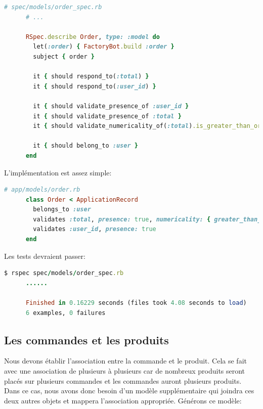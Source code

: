 \documentclass[]{report}
\begin{document}
    \begin{scriptsize}
      \begin{lstlisting}[language=ruby, caption={Premiers tests du modèle de commande}]
      # spec/models/order_spec.rb
      # ...

      RSpec.describe Order, type: :model do
        let(:order) { FactoryBot.build :order }
        subject { order }

        it { should respond_to(:total) }
        it { should respond_to(:user_id) }

        it { should validate_presence_of :user_id }
        it { should validate_presence_of :total }
        it { should validate_numericality_of(:total).is_greater_than_or_equal_to(0) }

        it { should belong_to :user }
      end
      \end{lstlisting}
    \end{scriptsize}

    L'implémentation est assez simple:

    \begin{scriptsize}
      \begin{lstlisting}[language=ruby, caption={Validateurs du modèle de commande}]
      # app/models/order.rb
      class Order < ApplicationRecord
        belongs_to :user
        validates :total, presence: true, numericality: { greater_than_or_equal_to: 0 }
        validates :user_id, presence: true
      end
      \end{lstlisting}
    \end{scriptsize}

    Les tests devraient passer:

    \begin{scriptsize}
      \begin{lstlisting}[language=ruby, caption={Validateurs du modèle de commande}]
      $ rspec spec/models/order_spec.rb
      ......

      Finished in 0.16229 seconds (files took 4.08 seconds to load)
      6 examples, 0 failures
      \end{lstlisting}
    \end{scriptsize}

    \subsection{Les commandes et les produits}

      Nous devons établir l'association entre la commande et le produit. Cela se fait avec une association de plusieurs à plusieurs car de nombreux produits seront placés sur plusieurs commandes et les commandes auront plusieurs produits. Dans ce cas, nous avons donc besoin d'un modèle supplémentaire qui joindra ces deux autres objets et mappera l'association appropriée. Générons ce modèle:
\end{document}
